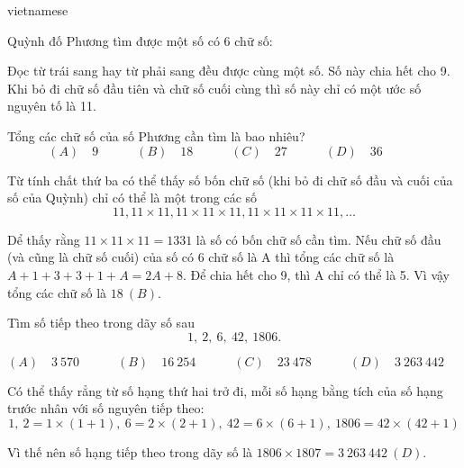 \documentclass{article}
\begin{document}
\begin{otherlanguage*}{vietnamese}
\begin{problem*}[PI-2024-C-P15]
    \label{problem:pi-2024-c-p15}

    Quỳnh đố Phương tìm được một số có 6 chữ số:
    \begin{enumerate}[topsep=0pt, partopsep=0pt, itemsep=0pt]
        \ii Đọc từ trái sang hay từ phải sang đều được cùng một số.
        \ii Số này chia hết cho 9.
        \ii Khi bỏ đi chữ số đầu tiên và chữ số cuối cùng thì số này chỉ có một ước số nguyên tố là 11.
    \end{enumerate}

    Tổng các chữ số của số Phương cần tìm là bao nhiêu?
    \[
        (A) \quad 9 \qquad \quad
        (B) \quad 18 \qquad \quad
        (C) \quad 27 \qquad \quad
        (D) \quad 36 \qquad \quad
    \]
\end{problem*}

\begin{soln}
    Từ tính chất thứ ba có thể thấy số bốn chữ số (khi bỏ đi chữ số đầu và cuối của số của Quỳnh) chỉ có thể là một trong các số
    \[
        11, 11\times 11, 11\times 11 \times 11, 11\times 11 \times11 \times 11, \ldots
    \]

    Dể thấy rằng $11\times 11 \times 11 = 1331$ là số có bốn chữ số cần tìm. Nếu chữ số đầu (và cũng là chữ số cuối) của số có 6 chữ số là A thì
    tổng các chữ số là $A + 1 + 3 + 3 + 1 +A = 2A +8.$ Để chia hết cho 9, thì A chỉ có thể là 5.
    Vì vậy tổng các chữ số là $\boxed{18\ (B).}$
\end{soln}

\newpage

\begin{problem*}[PI-2024-C-P16]
    \label{problem:pi-2024-c-p16}

    Tìm số tiếp theo trong dãy số sau
    \[
        1,\ 2,\ 6,\ 42,\ 1806.
    \]

    \[
        (A) \quad 3\ 570 \qquad \quad
        (B) \quad 16\ 254 \qquad \quad
        (C) \quad 23\ 478 \qquad \quad
        (D) \quad 3\ 263\ 442 \qquad \quad
    \]
\end{problem*}

\begin{soln}
    Có thể thấy rẳng từ số hạng thứ hai trở đi, mỗi số hạng bằng tích của số hạng trước nhân với số nguyên tiếp theo:
    \[
        1,\ 2 = 1 \times (1+ 1),\ 6=2 \times (2+1),\ 42 = 6 \times (6+1),\ 1806 = 42\times(42+1)
    \]

    Vì thế nên số hạng tiếp theo trong dãy số là $1806 \times 1807 = \boxed{3\ 263\ 442\ (D)}.$
\end{soln}


\end{otherlanguage*}
\end{document}
